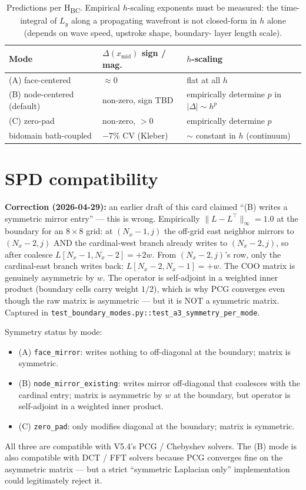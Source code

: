 \documentclass[11pt,letterpaper]{article}
\begin{document}
\begin{table}[h]\centering
\renewcommand{\arraystretch}{1.25}
\begin{tabular}{@{}lll@{}}
\toprule
\textbf{Mode} & $\Delta(x_{\mathrm{mid}})$ \textbf{sign / mag.} & $h$\textbf{-scaling} \\ \midrule
(A) face-centered            & $\approx 0$           & flat at all $h$ \\
(B) node-centered (default)  & non-zero, sign TBD    & empirically determine $p$ in $|\Delta| \sim h^p$ \\
(C) zero-pad                 & non-zero, $> 0$       & empirically determine $p$ \\
bidomain bath-coupled        & $-7\%$ CV (Kleber)    & $\sim$ constant in $h$ (continuum) \\
\bottomrule
\end{tabular}
\caption{Predictions per H\textsubscript{BC}. Empirical $h$-scaling exponents
must be measured: the time-integral of $L_y$ along a propagating wavefront is
not closed-form in $h$ alone (depends on wave speed, upstroke shape, boundary-
layer length scale).}
\end{table}

\section{SPD compatibility}

\textbf{Correction (2026-04-29):} an earlier draft of this card claimed
``(B) writes a symmetric mirror entry'' --- this is wrong. Empirically
$\|L - L^\top\|_\infty = 1.0$ at the boundary for an $8\times8$ grid: at
$(N_x-1, j)$ the off-grid east neighbor mirrors to $(N_x-2, j)$ AND the
cardinal-west branch already writes to $(N_x-2, j)$, so after coalesce
$L[N_x-1, N_x-2] = +2w$. From $(N_x-2, j)$'s row, only the cardinal-east
branch writes back: $L[N_x-2, N_x-1] = +w$. The COO matrix is genuinely
asymmetric by $w$. The operator is self-adjoint in a weighted inner
product (boundary cells carry weight $1/2$), which is why PCG converges
even though the raw matrix is asymmetric --- but it is NOT a symmetric
matrix. Captured in \texttt{test\_boundary\_modes.py::test\_a3\_symmetry\_per\_mode}.

Symmetry status by mode:
\begin{itemize}
\item (A) \texttt{face\_mirror}: writes nothing to off-diagonal at the boundary; matrix is symmetric.
\item (B) \texttt{node\_mirror\_existing}: writes mirror off-diagonal that coalesces with the cardinal entry; matrix is asymmetric by $w$ at the boundary, but operator is self-adjoint in a weighted inner product.
\item (C) \texttt{zero\_pad}: only modifies diagonal at the boundary; matrix is symmetric.
\end{itemize}
All three are compatible with V5.4's PCG / Chebyshev solvers. The (B) mode
is also compatible with DCT / FFT solvers because PCG converges fine on
the asymmetric matrix --- but a strict ``symmetric Laplacian only''
implementation could legitimately reject it.
\end{document}
